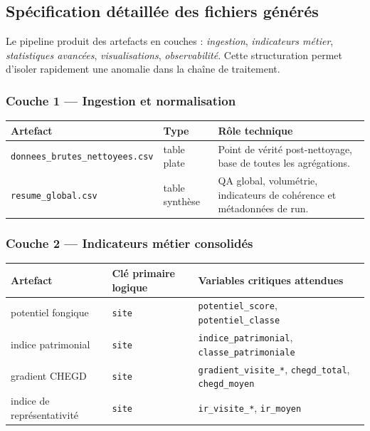 \documentclass[11pt,a4paper]{article}
\begin{document}
\subsection{Sp\'ecification d\'etaill\'ee des fichiers g\'en\'er\'es}
Le pipeline produit des artefacts en couches : \textit{ingestion},
\textit{indicateurs m\'etier}, \textit{statistiques avanc\'ees}, \textit{visualisations},
\textit{observabilit\'e}. Cette structuration permet d'isoler rapidement une anomalie
dans la chaîne de traitement.

\subsubsection{Couche 1 --- Ingestion et normalisation}
\begin{center}\begin{tabular}{p{}p{}p{}}
\toprule
\textbf{Artefact} & \textbf{Type} & \textbf{Rôle technique} \\
\midrule
\texttt{donnees\_brutes\_nettoyees.csv} & table plate & Point de v\'erit\'e post-nettoyage, base de toutes les agr\'egations. \\
\texttt{resume\_global.csv} & table synthèse & QA global, volum\'etrie, indicateurs de coh\'erence et m\'etadonn\'ees de run. \\
\bottomrule
\end{tabular}\end{center}

\subsubsection{Couche 2 --- Indicateurs m\'etier consolid\'es}
\begin{center}\begin{tabular}{p{}p{}p{}}
\toprule
\textbf{Artefact} & \textbf{Cl\'e primaire logique} & \textbf{Variables critiques attendues} \\
\midrule
potentiel fongique & \texttt{site} & \texttt{potentiel\_score}, \texttt{potentiel\_classe} \\
indice patrimonial & \texttt{site} & \texttt{indice\_patrimonial}, \texttt{classe\_patrimoniale} \\
gradient CHEGD & \texttt{site} & \texttt{gradient\_visite\_*}, \texttt{chegd\_total}, \texttt{chegd\_moyen} \\
indice de repr\'esentativit\'e & \texttt{site} & \texttt{ir\_visite\_*}, \texttt{ir\_moyen} \\
\bottomrule
\end{tabular}\end{center}
\end{document}
